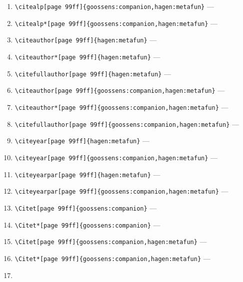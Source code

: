 \documentclass[12pt]{article}
\begin{document}
\begin{enumerate}
\verb|\citealp*[page 99ff]{hagen:metafun}| --- 
\citealp*[page 99ff]{hagen:metafun}
\item
\verb|\citealp[page 99ff]{goossens:companion,hagen:metafun}| --- 
\citealp[page 99ff]{goossens:companion,hagen:metafun}
\item
\verb|\citealp*[page 99ff]{goossens:companion,hagen:metafun}| --- 
\citealp*[page 99ff]{goossens:companion,hagen:metafun}
\item
\verb|\citeauthor[page 99ff]{hagen:metafun}| --- 
\citeauthor[page 99ff]{hagen:metafun}
\item
\verb|\citeauthor*[page 99ff]{hagen:metafun}| --- 
\citeauthor*[page 99ff]{hagen:metafun}
\item
\verb|\citefullauthor[page 99ff]{hagen:metafun}| --- 
\item
\verb|\citeauthor[page 99ff]{goossens:companion,hagen:metafun}| --- 
\citeauthor[page 99ff]{goossens:companion,hagen:metafun}
\item
\verb|\citeauthor*[page 99ff]{goossens:companion,hagen:metafun}| --- 
\citeauthor*[page 99ff]{goossens:companion,hagen:metafun}
\item
\verb|\citefullauthor[page 99ff]{goossens:companion,hagen:metafun}| --- 
\item
\verb|\citeyear[page 99ff]{hagen:metafun}| --- 
\citeyear[page 99ff]{hagen:metafun}
\item
\verb|\citeyear[page 99ff]{goossens:companion,hagen:metafun}| --- 
\citeyear[page 99ff]{goossens:companion,hagen:metafun}
\item
\verb|\citeyearpar[page 99ff]{hagen:metafun}| --- 
\citeyearpar[page 99ff]{hagen:metafun}
\item
\verb|\citeyearpar[page 99ff]{goossens:companion,hagen:metafun}| --- 
\citeyearpar[page 99ff]{goossens:companion,hagen:metafun}
\item
\verb|\Citet[page 99ff]{goossens:companion}| --- 
\item
\verb|\Citet*[page 99ff]{goossens:companion}| --- 
\item
\verb|\Citet[page 99ff]{goossens:companion,hagen:metafun}| --- 
\item
\verb|\Citet*[page 99ff]{goossens:companion,hagen:metafun}| --- 
\item

\end{enumerate}
\end{document}
